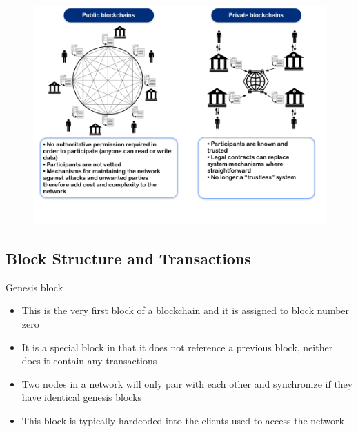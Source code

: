 \documentclass[10pt]{beamer}
\begin{document}

\begin{frame}
	\begin{figure}[]
		\centering
		\includegraphics  [scale=0.3]{Images/pvt}
	\end{figure}
\end{frame}

\subsection{Block Structure and Transactions}


\begin{frame}{Genesis block}
	\begin{itemize}
		\item This is the very first block of a blockchain and it is assigned to block number zero
		\item It is a special block in that it does not reference a previous block, neither does it contain any transactions
		\item Two nodes in a network will only pair with each other and synchronize if they have identical genesis blocks
		\item This block is typically hardcoded into the clients used to access the network
	\end{itemize}
\end{frame}

\end{document}
